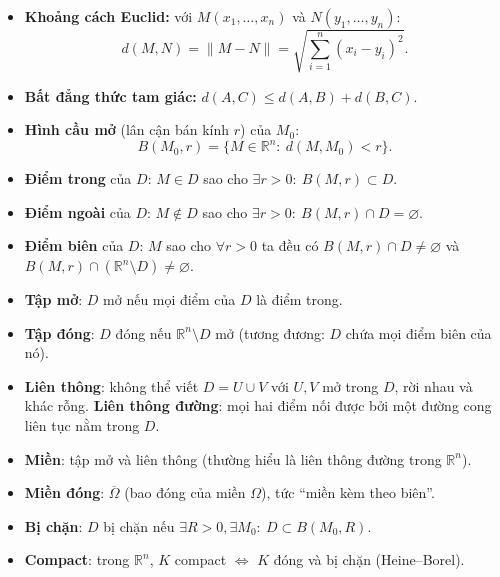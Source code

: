 \documentclass[12pt,a4paper]{article}
\begin{document}
\begin{dinhnghia}[title={Tập hợp trong $\mathbb{R}^n$}]
  \begin{itemize}
    \item \textbf{Khoảng cách Euclid:} với $M(x_1,\ldots,x_n)$ và $N(y_1,\ldots,y_n)$:
    \[
      d(M,N)=\|M-N\|=\sqrt{\sum_{i=1}^{n}(x_i-y_i)^2}.
    \]
    \item \textbf{Bất đẳng thức tam giác:} $d(A,C)\le d(A,B)+d(B,C)$.
    \item \textbf{Hình cầu mở} (lân cận bán kính $r$) của $M_0$:
    \[
      B(M_0,r)=\{M\in\mathbb{R}^n:\ d(M,M_0)<r\}.
    \]
    \item \textbf{Điểm trong} của $D$: $M\in D$ sao cho $\exists r>0:\ B(M,r)\subset D$.
    \item \textbf{Điểm ngoài} của $D$: $M\notin D$ sao cho $\exists r>0:\ B(M,r)\cap D=\varnothing$.
    \item \textbf{Điểm biên} của $D$: $M$ sao cho $\forall r>0$ ta đều có $B(M,r)\cap D\neq\varnothing$ và $B(M,r)\cap(\mathbb{R}^n\setminus D)\neq\varnothing$.
    \item \textbf{Tập mở}: $D$ mở nếu mọi điểm của $D$ là điểm trong.
    \item \textbf{Tập đóng}: $D$ đóng nếu $\mathbb{R}^n\setminus D$ mở (tương đương: $D$ chứa mọi điểm biên của nó).
    \item \textbf{Liên thông}: không thể viết $D=U\cup V$ với $U,V$ mở trong $D$, rời nhau và khác rỗng. \textbf{Liên thông đường}: mọi hai điểm nối được bởi một đường cong liên tục nằm trong $D$.
    \item \textbf{Miền}: tập mở và liên thông (thường hiểu là liên thông đường trong $\mathbb{R}^n$).
    \item \textbf{Miền đóng}: $\overline{\Omega}$ (bao đóng của miền $\Omega$), tức ``miền kèm theo biên''.
    \item \textbf{Bị chặn}: $D$ bị chặn nếu $\exists R>0,\exists M_0:\ D\subset B(M_0,R)$.
    \item \textbf{Compact}: trong $\mathbb{R}^n$, $K$ compact $\Leftrightarrow$ $K$ đóng và bị chặn (Heine--Borel).
  \end{itemize}
\end{dinhnghia}
\end{document}
